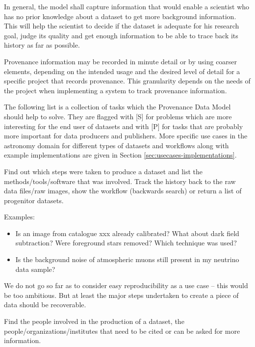 In general, the model shall capture information that would enable a scientist who has no prior knowledge about a dataset to get more background information. 
This will help the scientist to decide if the dataset 
is adequate for his research goal, judge its quality and get enough information
to be able to trace back its history as far as possible. 

Provenance information may be recorded in minute detail or by using coarser
elements, depending on the intended usage and the desired level of detail
for a specific project that records provenance. 
This granularity depends on the needs of the project when implementing a system to track provenance information.

The following list is a collection of tasks which the Provenance Data Model should help to solve. They are flagged with [S] for problems which are more interesting for the end user of datasets and with [P] for tasks that are probably more important for data producers and publishers.
More specific use cases in the astronomy domain for different types of datasets and workflows along with example implementations are given in Section \ref{sec:usecases-implementations}.


        Find out which steps were taken to produce a dataset and list the methods/tools/software that was involved. 
        Track the history back to the raw data files/raw images, show the workflow (backwards search) or return a list of progenitor datasets.

        \noindent Examples: 
        \begin{itemize}
            \item Is an image from catalogue xxx already calibrated?
What about dark field subtraction? Were foreground stars removed? Which technique
was used?  
            \item Is the background noise of atmospheric muons still present in my neutrino data sample?  
        \end{itemize}

        We do not go so far as to consider easy reproducibility as a use case -- this would be too ambitious. But at least the 
        major steps undertaken to create a piece of data should be recoverable.


        Find the people involved in the production of a dataset,
        the people/organizations/institutes that need to be cited or can be asked for more information.

